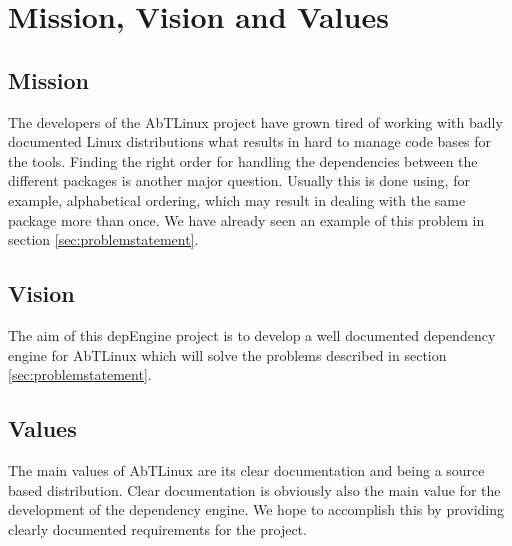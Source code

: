 \section{Mission, Vision and Values}

\subsection{Mission}
The developers of the AbTLinux project have grown tired of working with badly documented Linux distributions what results in hard to manage code bases for the tools. Finding the right order for handling the dependencies between the different packages is another major question. Usually this is done using, for example, alphabetical ordering, which may result in dealing with the same package more than once. We have already seen an example of this problem in section \ref{sec:problemstatement}.

\subsection{Vision}
The aim of this depEngine project is to develop a well documented dependency engine for AbTLinux which will solve the problems described in section \ref{sec:problemstatement}.

\subsection{Values}
The main values of AbTLinux are its clear documentation and being a source based distribution. Clear documentation is obviously also the main value for the development of the dependency engine. We hope to accomplish this by providing clearly documented requirements for the project.